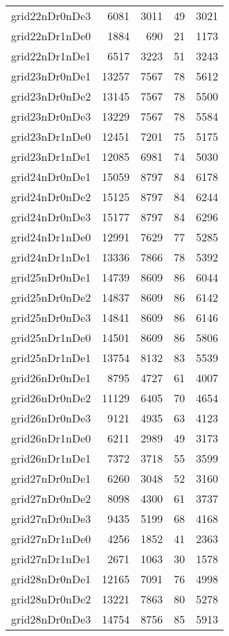 \begin{longtable}{lrrrr}
grid22nDr0nDe3 & 6081 & 3011 & 49 & 3021 \\
grid22nDr1nDe0 & 1884 & 690 & 21 & 1173 \\
grid22nDr1nDe1 & 6517 & 3223 & 51 & 3243 \\
grid23nDr0nDe1 & 13257 & 7567 & 78 & 5612 \\
grid23nDr0nDe2 & 13145 & 7567 & 78 & 5500 \\
grid23nDr0nDe3 & 13229 & 7567 & 78 & 5584 \\
grid23nDr1nDe0 & 12451 & 7201 & 75 & 5175 \\
grid23nDr1nDe1 & 12085 & 6981 & 74 & 5030 \\
grid24nDr0nDe1 & 15059 & 8797 & 84 & 6178 \\
grid24nDr0nDe2 & 15125 & 8797 & 84 & 6244 \\
grid24nDr0nDe3 & 15177 & 8797 & 84 & 6296 \\
grid24nDr1nDe0 & 12991 & 7629 & 77 & 5285 \\
grid24nDr1nDe1 & 13336 & 7866 & 78 & 5392 \\
grid25nDr0nDe1 & 14739 & 8609 & 86 & 6044 \\
grid25nDr0nDe2 & 14837 & 8609 & 86 & 6142 \\
grid25nDr0nDe3 & 14841 & 8609 & 86 & 6146 \\
grid25nDr1nDe0 & 14501 & 8609 & 86 & 5806 \\
grid25nDr1nDe1 & 13754 & 8132 & 83 & 5539 \\
grid26nDr0nDe1 & 8795 & 4727 & 61 & 4007 \\
grid26nDr0nDe2 & 11129 & 6405 & 70 & 4654 \\
grid26nDr0nDe3 & 9121 & 4935 & 63 & 4123 \\
grid26nDr1nDe0 & 6211 & 2989 & 49 & 3173 \\
grid26nDr1nDe1 & 7372 & 3718 & 55 & 3599 \\
grid27nDr0nDe1 & 6260 & 3048 & 52 & 3160 \\
grid27nDr0nDe2 & 8098 & 4300 & 61 & 3737 \\
grid27nDr0nDe3 & 9435 & 5199 & 68 & 4168 \\
grid27nDr1nDe0 & 4256 & 1852 & 41 & 2363 \\
grid27nDr1nDe1 & 2671 & 1063 & 30 & 1578 \\
grid28nDr0nDe1 & 12165 & 7091 & 76 & 4998 \\
grid28nDr0nDe2 & 13221 & 7863 & 80 & 5278 \\
grid28nDr0nDe3 & 14754 & 8756 & 85 & 5913 \\

\end{longtable}
